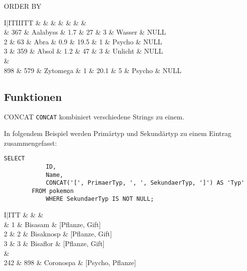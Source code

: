 \begin{sql}{ORDER BY}
    \begin{tabular}{I|ITIIITT}
        &  &  &  &  &  &  &  \\ & 367 & Aalabyss & 1.7 & 27 & 3 & Wasser & NULL \\
        2 & 63 & Abra & 0.9 & 19.5 & 1 & Psycho & NULL \\
        3 & 359 & Absol & 1.2 & 47 & 3 & Unlicht & NULL \\       
         &  \\
        898 & 579 & Zytomega & 1 & 20.1 & 5 & Psycho & NULL \\
    \end{tabular}
\end{sql}

\subsection{Funktionen}

\begin{sql}{CONCAT}
    \texttt{CONCAT} kombiniert verschiedene Strings zu einem.

    In folgendem Beispiel werden Primärtyp und Sekundärtyp zu einem Eintrag zusammengefasst:

    \begin{lstlisting}[style=SqlInputStyle]
        SELECT
            ID,
            Name,
            CONCAT('[', PrimaerTyp, ', ', SekundaerTyp, ']') AS 'Typ'
        FROM pokemon
            WHERE SekundaerTyp IS NOT NULL;
    \end{lstlisting}

    \begin{tabular}{I|ITT}
        &  &  &  \\ & 1 & Bisasam & [Pflanze, Gift] \\
        2 & 2 & Bisaknosp & [Pflanze, Gift] \\
        3 & 3 & Bisaflor & [Pflanze, Gift] \\
         &  \\
        242 & 898 & Coronospa & [Psycho, Pflanze] \\
    \end{tabular}
\end{sql}

